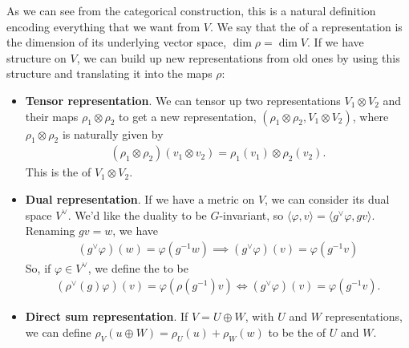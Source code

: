 \documentclass[11pt]{article}
\begin{document}
As we can see from the categorical construction, this is a natural definition 
encoding everything that we want from $V$. We say that the  of 
a representation is the dimension of its underlying vector space, 
$\dim{\rho} = \dim{V}$. If we have structure on $V$, we can build up new 
representations from old ones by using this structure and translating it into 
the maps $\rho$:
\begin{itemize}
    \item \textbf{Tensor representation}. We can tensor up two representations
    $V_1 \otimes V_2$ and their maps $\rho_1 \otimes \rho_2$ to get a new representation,
    $(\rho_1 \otimes \rho_2, V_1 \otimes V_2)$, where $\rho_1 \otimes \rho_2$ is
    naturally given by
    \begin{align*}
        (\rho_1 \otimes \rho_2)(v_1 \otimes v_2) = \rho_1(v_1) \otimes \rho_2(v_2).
    \end{align*}
    This is the  of $V_1 \otimes V_2$.
    \item \textbf{Dual representation}. If we have a metric on $V$,
    we can consider its dual space $V^\vee$. We'd like the duality to
    be $G$-invariant, so $\langle \varphi, v \rangle = \langle g^{\vee} \varphi, g v \rangle$.
    Renaming $g v = w$, we have
    \begin{align*}
        (g^\vee \varphi)(w) = \varphi(g^{-1}w) \implies (g^\vee \varphi)(v) = \varphi(g^{-1}v)
    \end{align*}
    So, if $\varphi \in V^\vee$, we define the  
    to be
    \begin{align*}
        (\rho^\vee(g) \varphi)(v) = \varphi(\rho(g^{-1})v)
        \iff
        (g^\vee \varphi)(v) = \varphi(g^{-1}v).
    \end{align*}
    \item \textbf{Direct sum representation}. If $V = U \oplus W$,
    with $U$ and $W$ representations, we can define
    $\rho_V(u \oplus W) = \rho_U(u) + \rho_W(w)$ to be the
     of $U$ and $W$.
\end{itemize}
\end{document}
